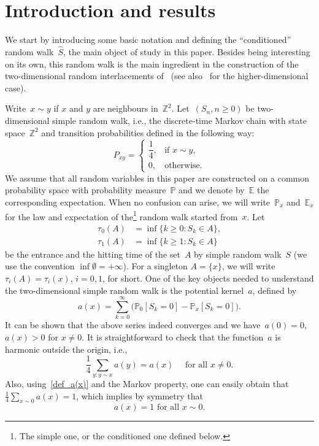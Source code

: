 \documentclass[11pt]{article}
\theoremstyle{definition}
\numberwithin{equation}{section}
\numberwithin{figure}{section}
\numberwithin{table}{section}
\newcommand{\1}[1]{{\mathbf 1}{\{#1\}}}
\newcommand{\Z}{\mathbb{Z}}
\newcommand{\s}{{\widehat S}}
\newcommand{\8}{{\infty}}
\newcommand{\IP}{{\mathbb P}}
\newcommand{\IE}{{\mathbb E}}
\begin{document}
\section{Introduction and results}\label{s_introres}

We start by introducing some basic notation and defining the ``conditioned'' random walk~$\s$, the main object of study in this paper. Besides being interesting on its own, this random walk is the main ingredient in the construction of the two-dimensional random interlacements of~\cite{CP16,CPV16} (see also~\cite{CT12,DRS14,SLT,Szn10} for the higher-dimensional case).

Write~$x\sim y$ if $x$ and $y$ are neighbours in~$\Z^2$. Let~$(S_n, n\geq 0)$ be two-dimensional simple random walk, i.e., the discrete-time Markov chain with state space~$\Z^2$ and transition probabilities defined in the following way:
\begin{equation}\label{def_S}
P_{xy} =
\begin{cases}
\dfrac{1}{4}, & \text{if }x\sim y,\\[0.6em]
0, & \text{otherwise}.
\end{cases}
\end{equation}
We assume that all random variables in this paper are constructed on a common probability space with probability measure~$\IP$ and we denote by~$\IE$ the corresponding expectation. When no confusion can arise, we will write~$\IP_x$ and~$\IE_x$ for the law and expectation of the\footnote{The simple one, or the conditioned one defined below.} random walk started from~$x$. Let
\begin{align}
\tau_0(A) &= \inf\{k\geq 0: S_k\in A\} \label{entrance_t},\\
\tau_1(A) &= \inf\{k\geq 1: S_k\in A\} \label{hitting_t}
\end{align}
be the entrance and the hitting time of the set~$A$ by simple random walk~$S$ (we use the convention $\inf \emptyset = +\8$). For a singleton $A=\{x\}$, we will write $\tau_i(A)=\tau_i(x)$, $i=0,1$, for short. One of the key objects needed to understand the two-dimensional simple random walk is the potential kernel~$a$, defined by
\begin{equation}\label{def_a(x)}
a(x) = \sum_{k=0}^\infty\big(\IP_0[S_k\!=\!0]-\IP_x[S_k\!=\!0]\big).
\end{equation}
It can be shown that the above series indeed converges and we have~$a(0)=0$, $a(x)>0$ for $x\neq 0$. It is straightforward to check that the function~$a$ is harmonic outside the origin, i.e.,
\begin{equation}\label{a_harm}
\frac{1}{4}\sum_{y: y\sim x}a(y) = a(x) \quad \text{ for all } x\neq 0.
\end{equation}
Also, using~\eqref{def_a(x)} and the Markov property, one can easily obtain that $\frac{1}{4}\sum_{x\sim 0}a(x)=1$, which implies by symmetry that
\begin{equation}\label{a(x)=1}
a(x)=1 \text{ for all }x\sim 0.
\end{equation}
\end{document}
